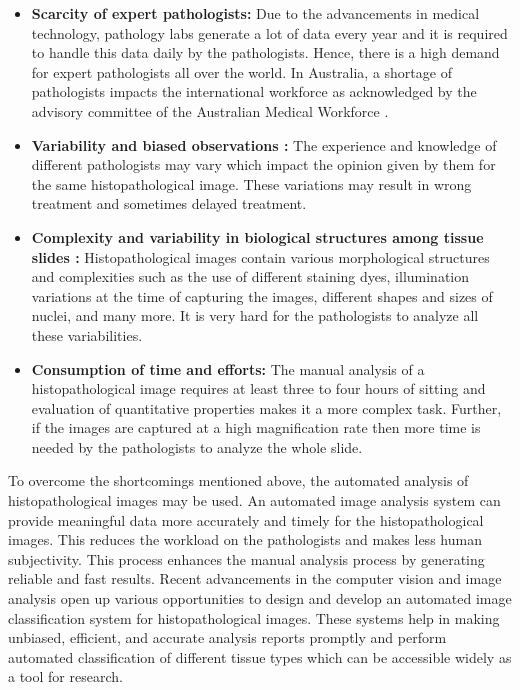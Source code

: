 \begin{itemize}
\item \textbf{Scarcity of expert pathologists:} Due to the advancements in medical technology, pathology labs generate a lot of data every year and it is required to handle this data daily by the pathologists. Hence, there is a high demand for expert pathologists all over the world. In Australia, a shortage of pathologists impacts the international workforce as acknowledged by the advisory committee of the Australian Medical Workforce \cite{cancer2010}.


\item \textbf{Variability and biased observations \cite{gurcan2009} \cite{cigdem2005}:} 
The experience and knowledge of different pathologists may vary which impact the opinion given by them for the same histopathological image. These variations may result in wrong treatment and sometimes delayed treatment.


\item \textbf{Complexity and variability in biological structures among tissue slides \cite{gurcan2009}:}
Histopathological images contain various morphological structures and complexities such as the use of different staining dyes, illumination variations at the time of capturing the images, different shapes and sizes of nuclei, and many more. It is very hard for the pathologists to analyze all these variabilities.

\item \textbf{Consumption of time and efforts:}
The manual analysis of a histopathological image requires at least three to four hours of sitting and evaluation of quantitative properties makes it a more complex task. Further, if the images are captured at a high magnification rate then more time is needed by the pathologists to analyze the whole slide.
\end{itemize}

To overcome the shortcomings mentioned above, the automated analysis of histopathological images may be used. An automated image analysis system  can provide meaningful data more accurately and timely for the histopathological images. This reduces the workload on the pathologists and makes less human subjectivity. This process enhances the manual analysis process by generating reliable and fast results. Recent advancements in the computer vision and image analysis open up various opportunities to design and develop an automated image classification system for histopathological images. 
These systems help in making unbiased, efficient, and accurate analysis reports promptly and perform automated classification of different tissue types which can be accessible widely as a tool for research. 

